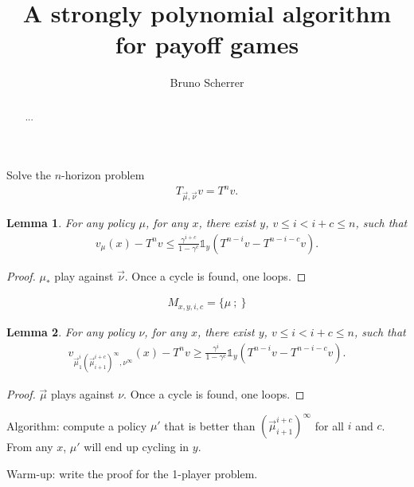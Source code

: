 \documentclass{article}
\title{A strongly polynomial algorithm for payoff games}
\author{Bruno Scherrer}
\newtheorem{lemma}{Lemma}
\def\1{{\mathds 1}}
\begin{document}
\maketitle

\begin{abstract}
...
\end{abstract}


Solve the $n$-horizon problem
\begin{align}
  T_{\vec\mu,\vec\nu} v = T^n v.
\end{align}


\begin{lemma}
  For any policy $\mu$, for any $x$, there exist $y$, $v \le i < i+c \le n$, such that
  \begin{align}
    v_{\mu}(x) - T^{n} v \le \frac{\gamma^{i+c}}{1-\gamma^c} \1_y (T^{n-i} v - T^{n-i-c} v).
  \end{align}
\end{lemma}
\begin{proof}
$\mu_*$ play against $\vec\nu$. Once a cycle is found, one loops.
\end{proof}

\begin{align}
  M_{x,y,i,c} = \{ \mu ~;~ \}
\end{align}

\begin{lemma}
  For any policy $\nu$, for any $x$, there exist $y$,  $v \le i < i+c \le n$, such that
  \begin{align}
    v_{\vec\mu_1^i(\vec\mu_{i+1}^{i+c})^\infty,\nu^\infty}(x) - T^{n} v \ge \frac{\gamma^i}{1-\gamma^c} \1_y (T^{n-i} v - T^{n-i-c} v).
  \end{align}
\end{lemma}
\begin{proof}
  $\vec\mu$ plays against $\nu$. Once a cycle is found, one loops.
\end{proof}

Algorithm: compute a policy $\mu'$ that is better than $(\vec\mu_{i+1}^{i+c})^\infty$ for all $i$ and $c$. From any $x$, $\mu'$ will end up cycling in $y$.

Warm-up: write the proof for the 1-player problem.



\end{document}
